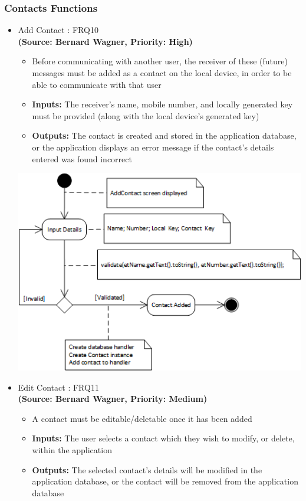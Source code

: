 \subsubsection{Contacts Functions}
\begin{itemize}
\item{Add Contact : FRQ10}\\
\textbf{(Source: Bernard Wagner, Priority: High)}
\begin{itemize}
\item Before communicating with another user, the receiver of these (future) messages must be added as a contact on the local device, in order to be able to communicate with that user
\item \textbf{Inputs:} The receiver's name, mobile number, and locally generated key must be provided (along with the local device's generated key)
\item \textbf{Outputs:} The contact is created and stored in the application database, or the application displays an error message if the contact's details entered was found incorrect
\end{itemize}
 \includegraphics[width=13cm]{diagrams/StateDiagrams/AddContactStateDiagram.png}
\item{Edit Contact : FRQ11}\\
\textbf{(Source: Bernard Wagner, Priority: Medium)}
\begin{itemize}
\item A contact must be editable/deletable once it has been added
\item \textbf{Inputs:} The user selects a contact which they wish to modify, or delete, within the application
\item \textbf{Outputs:} The selected contact's details will be modified in the application database, or the contact will be removed from the application database

\end{itemize}
\end{itemize}
